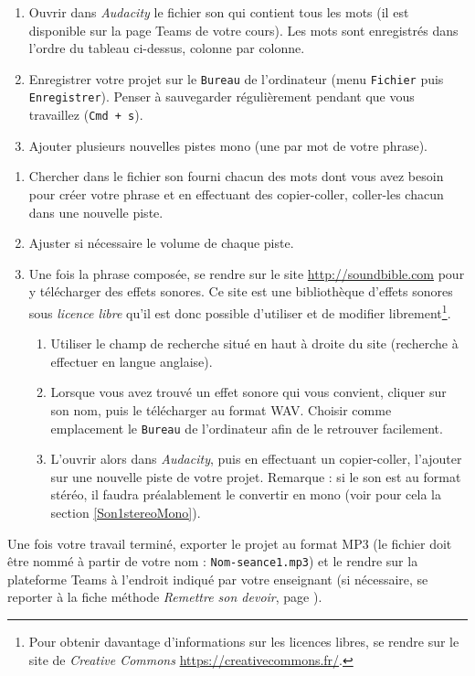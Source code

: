 {\begin{enumerate}
\item Ouvrir dans \emph{Audacity} le fichier son qui contient tous les mots (il est disponible sur la page Teams de votre cours). Les mots sont enregistrés dans l'ordre du tableau ci-dessus, colonne par colonne.
\item Enregistrer votre projet sur le \texttt{Bureau} de l'ordinateur (menu \texttt{Fichier} puis \texttt{Enregistrer}). Penser à sauvegarder régulièrement pendant que vous travaillez (\texttt{Cmd + s}).   
\item Ajouter plusieurs nouvelles pistes mono (une par mot de votre phrase). 
\setcounter{tmp}{\value{enumi}}  
\end{enumerate}
\begin{enumerate}
\setcounter{enumi}{\value{tmp}}
\item Chercher dans le fichier son fourni chacun des mots dont vous avez besoin pour créer votre phrase et en effectuant des copier-coller, coller-les chacun dans une nouvelle piste.
\item Ajuster si nécessaire le volume de chaque piste.
\item Une fois la phrase composée, se rendre sur le site \url{http://soundbible.com} pour y télécharger des effets sonores. Ce site est une bibliothèque d'effets sonores sous \emph{licence libre} qu'il est donc possible d'utiliser et de modifier librement\footnote{Pour obtenir davantage d'informations sur les licences libres, se rendre sur le site de \emph{Creative Commons} \url{https://creativecommons.fr/}.}.
        \begin{enumerate}
        \item Utiliser le champ de recherche situé en haut à droite du site (recherche à effectuer en langue anglaise).
        \item Lorsque vous avez trouvé un effet sonore qui vous convient, cliquer sur son nom, puis le télécharger au format WAV. Choisir comme emplacement le \texttt{Bureau} de l'ordinateur afin de le retrouver facilement.
        \item L'ouvrir alors dans \emph{Audacity}, puis en effectuant un copier-coller, l'ajouter sur une nouvelle piste de votre projet. Remarque : si le son est au format stéréo, il faudra préalablement le convertir en mono (voir pour cela la section \vref{Son1stereoMono}). 
        \end{enumerate}
\end{enumerate}

\vspace{10pt}

Une fois votre travail terminé, exporter le projet au format MP3 (le fichier doit être nommé à partir de votre nom : \texttt{Nom-seance1.mp3}) et le rendre sur la plateforme Teams à l'endroit indiqué par votre enseignant (si nécessaire, se reporter à la fiche méthode \emph{Remettre son devoir}, page \pageref{TeamsRemettreDevoir}). 
}%

